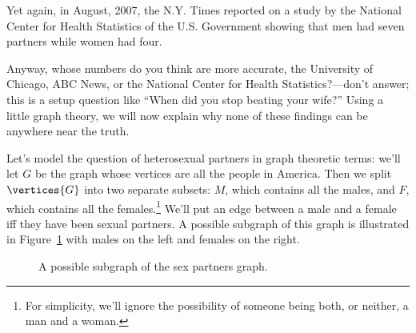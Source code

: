 Yet again, in August, 2007, the N.Y. Times reported
on a study by the National Center for Health Statistics of the
U.S. Government showing that men had seven partners while women had
four.

Anyway, whose numbers do you think are more accurate, the University
of Chicago, ABC News, or the National Center for Health
Statistics?---don't answer; this is a setup question like ``When did
you stop beating your wife?''  Using a little graph theory, we will
now explain why none of these findings can be anywhere near the truth.

Let's model the question of heterosexual partners in graph theoretic
terms: we'll let $G$ be the graph whose vertices
are all the people in America.  Then we split $\vertices{G}$ into two separate
subsets: $M$, which contains all the males, and $F$, which contains
all the females.\footnote{For simplicity, we'll ignore the possibility
  of someone being both, or neither, a man and a woman.}  We'll put an
edge between a male and a female iff they have been sexual partners.
A possible subgraph of this graph is illustrated in
Figure~\ref{fig:partners} with males on the left and females on the
right.

\begin{figure}[htbp]


\caption{A possible subgraph of the sex partners graph.}
\label{fig:partners}
\end{figure}

